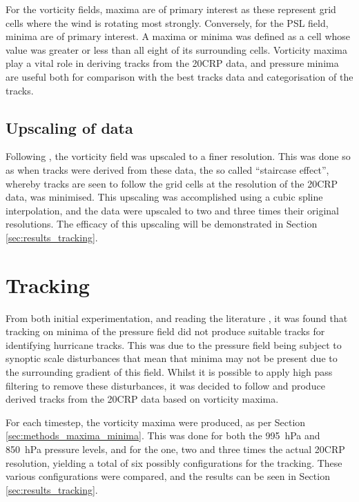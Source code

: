 \documentclass[pdftex,12pt,a4paper]{report}
\begin{document}
For the vorticity fields, maxima are of primary interest as these represent grid cells where the wind is rotating most strongly. Conversely, for the PSL field, minima are of primary interest. A maxima or minima was defined as a cell whose value was greater or less than all eight of its surrounding cells. Vorticity maxima play a vital role in deriving tracks from the 20CRP data, and pressure minima are useful both for comparison with the best tracks data and categorisation of the tracks.

\subsection{Upscaling of data}

Following \textcite{TODOhodgesXXX}, the vorticity field was upscaled to a finer resolution. This was done so as when tracks were derived from these data, the so called ``staircase effect'', whereby tracks are seen to follow the grid cells at the resolution of the 20CRP data, was minimised. This upscaling was accomplished using a cubic spline interpolation, and the data were upscaled to two and three times their original resolutions. The efficacy of this upscaling will be demonstrated in Section \ref{sec:results_tracking}.

\section{Tracking}

From both initial experimentation, and reading the literature \parencite{TODOmultiple}, it was found that tracking on minima of the pressure field did not produce suitable tracks for identifying hurricane tracks. This was due to the pressure field being subject to synoptic scale disturbances that mean that minima may not be present due to the surrounding gradient of this field. Whilst it is possible to apply high pass filtering to remove these disturbances, it was decided to follow \textcite{TODOmutliple} and produce derived tracks from the 20CRP data based on vorticity maxima.

For each timestep, the vorticity maxima were produced, as per Section \ref{sec:methods_maxima_minima}. This was done for both the \SI{995}{hPa} and \SI{850}{hPa} pressure levels, and for the one, two and three times the actual 20CRP resolution, yielding a total of six possibly configurations for the tracking. These various configurations were compared, and the results can be seen in Section \ref{sec:results_tracking}.
\end{document}
